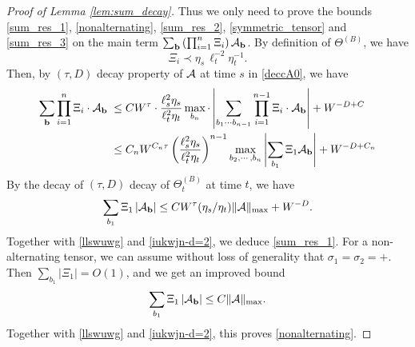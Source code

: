 \begin{proof}[Proof of Lemma \ref{lem:sum_decay}]
Thus we only need to prove the bounds \eqref{sum_res_1}, \eqref{nonalternating}, \eqref{sum_res_2}, \eqref{symmetric_tensor} and \eqref{sum_res_3} on the main term $\sum_{\textbf{b}}  \left(\prod_{i=1}^n  \Xi_i \right) {\cal A}_{\textbf{b}}$. By definition of $\Theta^{(B)}$, we have 
$$
\Xi_i \prec \eta_s \,\ell_t^{-2}\eta_t^{-1}.
$$
Then, by $(\tau,D)$ decay property of $\cal A$ at time $s$ in \eqref{deccA0}, we have
\begin{align}\label{llswuwg}
  \sum_{\textbf{b}}   \prod_{i=1}^n  \Xi_i  \cdot 
{\cal A}_{\textbf{b}}
\;\le\; & C W^{\tau}\cdot \frac{\ell_s^{2} \eta_s}{\ell_t^{2} \eta_t} \max_{b_n}
\cdot \left|\sum_{b_1\cdots b_{n-1}} \prod_{i=1}^{n-1}  \Xi_i  \cdot 
{\cal A}_{\textbf{b}}\right|+W^{-D+C}
\\\nonumber
\;\le\; & C_n W^{C_n\tau} \left(\frac{\ell_s^{2} \eta_s}{\ell_t^{2} \eta_t}\right)^{n-1} \max_{b_2,\cdots, b_n}  \left|\sum_{b_1 }\Xi_1 {\cal A}_{\textbf{b}}\right|+W^{-D+C_n}
\end{align}
By the decay of $(\tau,D)$ decay of $\Theta^{(B)}_t$ at time $t$, we have 
\begin{align}\label{tyzcsq}
  \sum_{b_1 }\Xi_1 \left|{\cal A}_{\textbf{b}}\right|\le CW^\tau (\eta_s/\eta_t)\|{\cal A}\|_{\max}+W^{-D}  .
\end{align}
Together with \eqref{llswuwg} and \eqref{iukwjn-d=2}, we deduce  \eqref{sum_res_1}. For a non-alternating tensor, we can assume without loss of generality that $\sigma_1=\sigma_2=+$. Then $\sum_{b_1}|\Xi_1|=O(1)$, and we get an improved bound
$$
\sum_{b_1 }\Xi_1\left| {\cal A}_{\textbf{b}}\right|\le  C\|{\cal A}\|_{\max} .
$$
Together with \eqref{llswuwg} and \eqref{iukwjn-d=2}, this proves \eqref{nonalternating}.


\end{proof}
